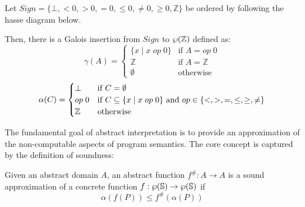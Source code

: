\documentclass[
  10pt,       %
  twoside,    %
  a4paper,    %
  english,    %
  tikz,       %
  openright,  %
]{book}
\begin{document}
\begin{example}
  \label{exmp:sign}
  Let $Sign = \{ \bot , <0, >0, =0, \leq 0, \neq 0, \geq 0, \mathbb{Z}\}$ be 
  ordered by following the hasse diagram below.

  \begin{center}
  \end{center}

  Then, there is a Galois insertion from $Sign$ to $\wp(\mathbb{Z})$ defined as:
  $$\gamma(A) = \begin{cases}
    \{ x \mid x \;op\; 0 \} & \text{if } A = op\;0 \\
    \mathbb{Z}              & \text{if } A = \mathbb{Z} \\
    \emptyset & \text{otherwise}
  \end{cases}$$
  $$\alpha(C) = \begin{cases}
    \bot & \text{if } C = \emptyset \\
    op \; 0 & \text{if } C \subseteq \{ x \mid x \; op \; 0 \}
        \text{ and } op \in \{<, >, =, \leq, \geq, \neq \} \\
    \mathbb{Z} & \text{otherwise}
  \end{cases}$$
\end{example}

The fundamental goal of abstract interpretation is to provide an approximation 
of the non-computable aspects of program semantics. The core concept is captured 
by the definition of soundness:

\begin{definition}[Soundness]
  Given an abstract domain $A$, an abstract function $f^\# : A \to A$ is a 
  sound approximation of a concrete function $f : \wp(\mathbb{S}) \to 
  \wp(\mathbb{S})$ if
  $$\alpha(f(P)) \leq f^\#(\alpha(P))$$
\end{definition}
\end{document}
